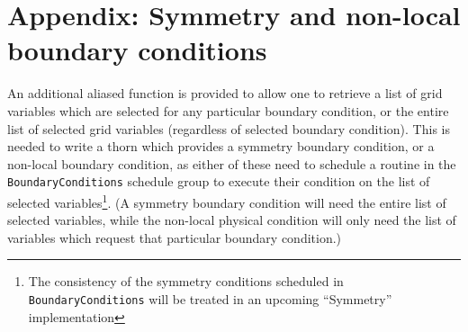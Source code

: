 \documentclass{article}
\begin{document}
\section{Appendix: Symmetry and non-local boundary conditions}
\label{Boundary/apx:symmetry}

An additional aliased function is provided to allow one to retrieve a
list of grid variables which are selected for any particular boundary
condition, or the entire list of selected grid variables (regardless of
selected boundary condition).  This is needed to write a thorn which
provides a symmetry boundary condition, or a non-local boundary
condition, as either of these need to schedule a routine in the
\texttt{BoundaryConditions} schedule group to execute their condition
on the list of selected variables\footnote{The consistency of the
symmetry conditions scheduled in \texttt{BoundaryConditions} will be
treated in an upcoming ``Symmetry'' implementation}.  (A symmetry
boundary condition will need the entire list of selected variables,
while the non-local physical condition will only need the list of
variables which request that particular boundary condition.)
\end{document}
